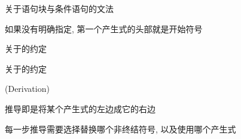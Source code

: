 \begin{frame}{}
  \begin{center}

    \vspace{0.20cm}
    关于语句块与条件语句的文法

    \vspace{0.50cm}
     如果没有明确指定, 第一个产生式的头部就是开始符号
  \end{center}
\end{frame}

\begin{frame}{}
  \begin{center}
    关于的约定

    \vspace{0.30cm}
  \end{center}
\end{frame}

\begin{frame}{}
  \begin{center}
    关于的约定

    \vspace{0.30cm}
  \end{center}
\end{frame}


\begin{frame}{}
  \begin{center}
    {\large {}} (Derivation)

    \vspace{0.50cm}

    \vspace{0.50cm}
    推导即是将某个产生式的左边成它的右边

    \vspace{1.00cm}
    每一步推导需要选择替换哪个非终结符号, 以及使用哪个产生式
  \end{center}
\end{frame}

